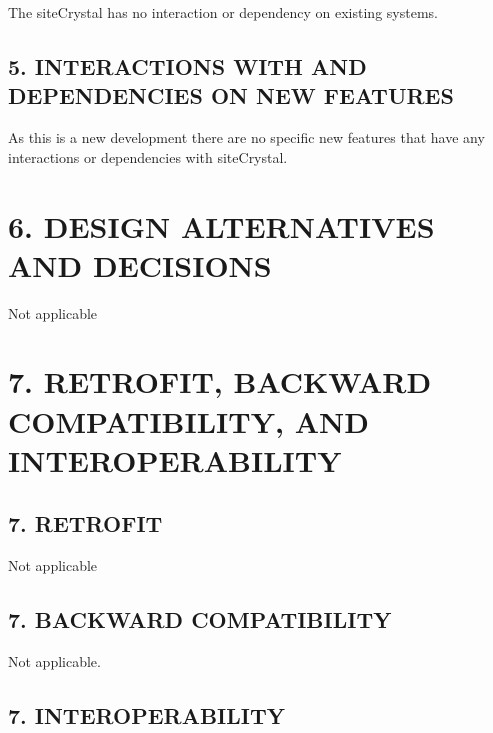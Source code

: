 \begin{DoxyVerb}The siteCrystal has no interaction or dependency on existing systems.
\end{DoxyVerb}
\hypertarget{index_sec_5_2}{}\subsection{5.	\+I\+N\+T\+E\+R\+A\+C\+T\+I\+O\+N\+S W\+I\+T\+H A\+N\+D D\+E\+P\+E\+N\+D\+E\+N\+C\+I\+E\+S O\+N N\+E\+W F\+E\+A\+T\+U\+R\+E\+S}\label{index_sec_5_2}
\begin{DoxyVerb}As this is a new development there are no specific new features that have any interactions or
dependencies with siteCrystal.
\end{DoxyVerb}
\hypertarget{index_sec_6}{}\section{6.	\+D\+E\+S\+I\+G\+N A\+L\+T\+E\+R\+N\+A\+T\+I\+V\+E\+S A\+N\+D D\+E\+C\+I\+S\+I\+O\+N\+S}\label{index_sec_6}
\begin{DoxyVerb}Not applicable
\end{DoxyVerb}
\hypertarget{index_sec_7}{}\section{7.	\+R\+E\+T\+R\+O\+F\+I\+T, B\+A\+C\+K\+W\+A\+R\+D C\+O\+M\+P\+A\+T\+I\+B\+I\+L\+I\+T\+Y, A\+N\+D I\+N\+T\+E\+R\+O\+P\+E\+R\+A\+B\+I\+L\+I\+T\+Y}\label{index_sec_7}
\hypertarget{index_sec_7_1}{}\subsection{7.	\+R\+E\+T\+R\+O\+F\+I\+T}\label{index_sec_7_1}
\begin{DoxyVerb}Not applicable
\end{DoxyVerb}
\hypertarget{index_sec_7_2}{}\subsection{7.	\+B\+A\+C\+K\+W\+A\+R\+D C\+O\+M\+P\+A\+T\+I\+B\+I\+L\+I\+T\+Y}\label{index_sec_7_2}
\begin{DoxyVerb}Not applicable.
\end{DoxyVerb}
\hypertarget{index_sec_7_3}{}\subsection{7.	\+I\+N\+T\+E\+R\+O\+P\+E\+R\+A\+B\+I\+L\+I\+T\+Y}\label{index_sec_7_3}
